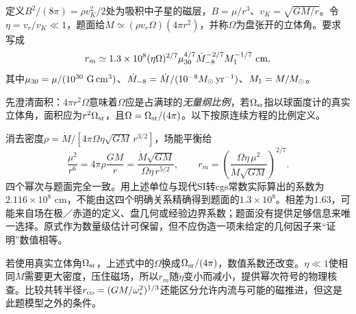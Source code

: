 \begin{exercise}
定义$B^2/(8\pi)=\rho v_K^2/2$处为吸积中子星的磁层，$B=\mu/r^3$、$v_K=\sqrt{GM/r}$。令$\eta=v_r/v_K\ll1$，题面给$\dot M\simeq(\rho v_r\Omega)(4\pi r^2)$，并称$\Omega$为盘张开的立体角。要求写成
\[
 r_m\simeq1.3\times10^8(\eta\Omega)^{2/7}
 \mu_{30}^{4/7}\dot M_{-8}^{-2/7}M_1^{-1/7}\ {\rm cm},
\]
其中$\mu_{30}=\mu/(10^{30}\ {\rm G\,cm^3})$、$\dot M_{-8}=\dot M/(10^{-8}M_{\odot}\,{\rm yr^{-1}})$、$M_1=M/M_{\odot}$。
\end{exercise}
\begin{solution}
先澄清面积：$4\pi r^2\Omega$意味着$\Omega$应是占满球的\emph{无量纲比例}，若$\Omega_{\rm sr}$指以球面度计的真实立体角，面积应为$r^2\Omega_{\rm sr}$，且$\Omega=\Omega_{\rm sr}/(4\pi)$。以下按原连续方程的比例定义。

消去密度$\rho=\dot M/[4\pi\Omega\eta\sqrt{GM}\,r^{3/2}]$，场能平衡给
\[
 \frac{\mu^2}{r^6}
 =4\pi\rho\frac{GM}{r}
 =\frac{\dot M\sqrt{GM}}{\Omega\eta\,r^{5/2}},
 \qquad
 r_m=\left(\frac{\Omega\eta\,\mu^2}{\dot M\sqrt{GM}}\right)^{2/7}.
\]
四个幂次与题面完全一致。用上述单位与现代SI转cgs常数实际算出的系数为$2.116\times10^8$ cm，不能由这四个明确关系精确得到题面的$1.3\times10^8$。相差为1.63，可能来自场在极／赤道的定义、盘几何或经验边界系数；题面没有提供足够信息来唯一选择。原式作为数量级估计可保留，但不应伪造一项未给定的几何因子来“证明”数值相等。

若使用真实立体角$\Omega_{\rm sr}$，上述式中的$\Omega$换成$\Omega_{\rm sr}/(4\pi)$，数值系数还改变。$\eta\ll1$使相同$\dot M$需要更大密度，压住磁场，所以$r_m$随$\eta$变小而减小，提供幂次符号的物理核查。比较共转半径$r_{\rm co}=(GM/\omega_*^2)^{1/3}$还能区分允许内流与可能的磁推进，但这是此题模型之外的条件。
\end{solution}


